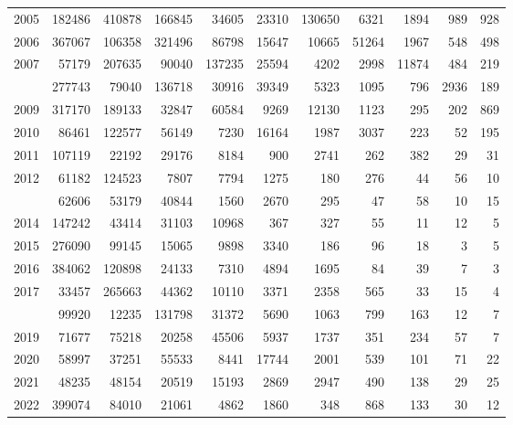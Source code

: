 \documentclass[
]{article}
\begin{document}
\begin{longtable}[t]{lrrrrrrrrrr}
2005 & 182486 & 410878 & 166845 & 34605 & 23310 & 130650 & 6321 & 1894 & 989 & 928\\
2006 & 367067 & 106358 & 321496 & 86798 & 15647 & 10665 & 51264 & 1967 & 548 & 498\\
2007 & 57179 & 207635 & 90040 & 137235 & 25594 & 4202 & 2998 & 11874 & 484 & 219\\
\addlinespace
2008 & 277743 & 79040 & 136718 & 30916 & 39349 & 5323 & 1095 & 796 & 2936 & 189\\
2009 & 317170 & 189133 & 32847 & 60584 & 9269 & 12130 & 1123 & 295 & 202 & 869\\
2010 & 86461 & 122577 & 56149 & 7230 & 16164 & 1987 & 3037 & 223 & 52 & 195\\
2011 & 107119 & 22192 & 29176 & 8184 & 900 & 2741 & 262 & 382 & 29 & 31\\
2012 & 61182 & 124523 & 7807 & 7794 & 1275 & 180 & 276 & 44 & 56 & 10\\
\addlinespace
2013 & 62606 & 53179 & 40844 & 1560 & 2670 & 295 & 47 & 58 & 10 & 15\\
2014 & 147242 & 43414 & 31103 & 10968 & 367 & 327 & 55 & 11 & 12 & 5\\
2015 & 276090 & 99145 & 15065 & 9898 & 3340 & 186 & 96 & 18 & 3 & 5\\
2016 & 384062 & 120898 & 24133 & 7310 & 4894 & 1695 & 84 & 39 & 7 & 3\\
2017 & 33457 & 265663 & 44362 & 10110 & 3371 & 2358 & 565 & 33 & 15 & 4\\
\addlinespace
2018 & 99920 & 12235 & 131798 & 31372 & 5690 & 1063 & 799 & 163 & 12 & 7\\
2019 & 71677 & 75218 & 20258 & 45506 & 5937 & 1737 & 351 & 234 & 57 & 7\\
2020 & 58997 & 37251 & 55533 & 8441 & 17744 & 2001 & 539 & 101 & 71 & 22\\
2021 & 48235 & 48154 & 20519 & 15193 & 2869 & 2947 & 490 & 138 & 29 & 25\\
2022 & 399074 & 84010 & 21061 & 4862 & 1860 & 348 & 868 & 133 & 30 & 12\\*
\end{longtable}
\end{document}
